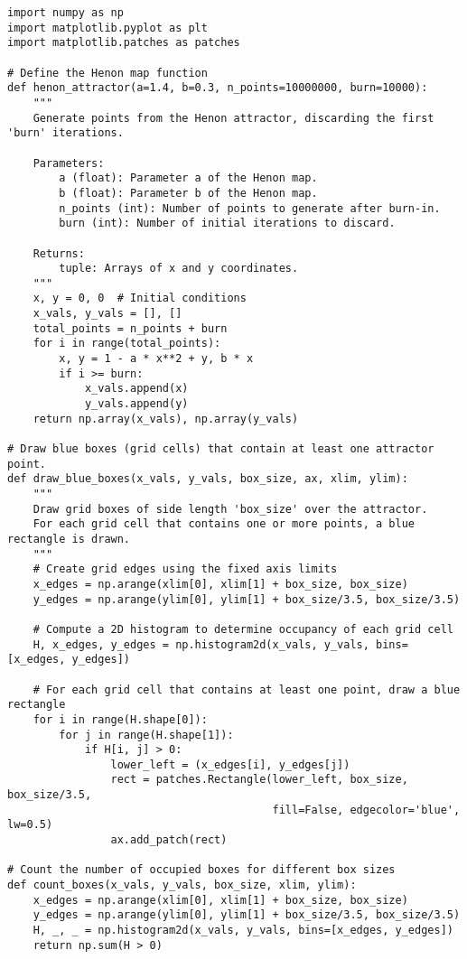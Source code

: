 \begin{lstlisting}[style=python]
import numpy as np
import matplotlib.pyplot as plt
import matplotlib.patches as patches

# Define the Henon map function
def henon_attractor(a=1.4, b=0.3, n_points=10000000, burn=10000):
    """
    Generate points from the Henon attractor, discarding the first 'burn' iterations.
    
    Parameters:
        a (float): Parameter a of the Henon map.
        b (float): Parameter b of the Henon map.
        n_points (int): Number of points to generate after burn-in.
        burn (int): Number of initial iterations to discard.
    
    Returns:
        tuple: Arrays of x and y coordinates.
    """
    x, y = 0, 0  # Initial conditions
    x_vals, y_vals = [], []
    total_points = n_points + burn
    for i in range(total_points):
        x, y = 1 - a * x**2 + y, b * x
        if i >= burn:
            x_vals.append(x)
            y_vals.append(y)
    return np.array(x_vals), np.array(y_vals)

# Draw blue boxes (grid cells) that contain at least one attractor point.
def draw_blue_boxes(x_vals, y_vals, box_size, ax, xlim, ylim):
    """
    Draw grid boxes of side length 'box_size' over the attractor.
    For each grid cell that contains one or more points, a blue rectangle is drawn.
    """
    # Create grid edges using the fixed axis limits
    x_edges = np.arange(xlim[0], xlim[1] + box_size, box_size)
    y_edges = np.arange(ylim[0], ylim[1] + box_size/3.5, box_size/3.5)
    
    # Compute a 2D histogram to determine occupancy of each grid cell
    H, x_edges, y_edges = np.histogram2d(x_vals, y_vals, bins=[x_edges, y_edges])
    
    # For each grid cell that contains at least one point, draw a blue rectangle
    for i in range(H.shape[0]):
        for j in range(H.shape[1]):
            if H[i, j] > 0:
                lower_left = (x_edges[i], y_edges[j])
                rect = patches.Rectangle(lower_left, box_size, box_size/3.5,
                                         fill=False, edgecolor='blue', lw=0.5)
                ax.add_patch(rect)

# Count the number of occupied boxes for different box sizes
def count_boxes(x_vals, y_vals, box_size, xlim, ylim):
    x_edges = np.arange(xlim[0], xlim[1] + box_size, box_size)
    y_edges = np.arange(ylim[0], ylim[1] + box_size/3.5, box_size/3.5)
    H, _, _ = np.histogram2d(x_vals, y_vals, bins=[x_edges, y_edges])
    return np.sum(H > 0)


\end{lstlisting}
